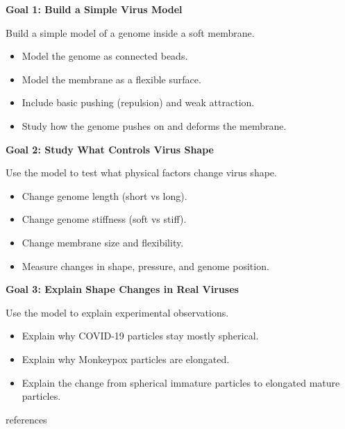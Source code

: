 \documentclass[12pt]{article}
\begin{document}
\begin{flushleft}
\textbf{Goal 1: Build a Simple Virus Model}

Build a simple model of a genome inside a soft membrane.\\
\vspace{-1em} 
\begin{itemize}
  \setlength{\itemsep}{0pt}
  \setlength{\parskip}{0pt}
  \setlength{\parsep}{0pt}
  \item Model the genome as connected beads.
  \item Model the membrane as a flexible surface.
  \item Include basic pushing (repulsion) and weak attraction.
  \item Study how the genome pushes on and deforms the membrane.
\end{itemize}

\textbf{Goal 2: Study What Controls Virus Shape}

Use the model to test what physical factors change virus shape.\\
\vspace{-1em}
\begin{itemize}
\setlength{\itemsep}{0pt}
\setlength{\parskip}{0pt}
\setlength{\parsep}{0pt}
\item Change genome length (short vs long).
\item Change genome stiffness (soft vs stiff).
\item Change membrane size and flexibility.
\item Measure changes in shape, pressure, and genome position.
\end{itemize}

\textbf{Goal 3: Explain Shape Changes in Real Viruses}

Use the model to explain experimental observations.\\
\vspace{-1em}
\begin{itemize}
\setlength{\itemsep}{0pt}
\setlength{\parskip}{0pt}
\setlength{\parsep}{0pt}
\item Explain why COVID-19 particles stay mostly spherical.
\item Explain why Monkeypox particles are elongated.
\item Explain the change from spherical immature particles to elongated mature particles.
\end{itemize}


\newpage

\end{flushleft}

 {references}  
\end{document}
